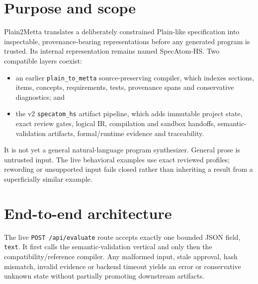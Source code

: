 \documentclass[11pt]{article}
\newcommand{\code}[1]{\texttt{#1}}
\begin{document}
\section{Purpose and scope}

Plain2Metta translates a deliberately constrained Plain-like specification
into inspectable, provenance-bearing representations before any generated
program is trusted.  Its internal representation remains named
SpecAtom-HS.  Two compatible layers coexist:

\begin{itemize}
\item an earlier \code{plain\_to\_metta} source-preserving compiler, which
indexes sections, items, concepts, requirements, tests, provenance spans and
conservative diagnostics; and
\item the v2 \code{specatom\_hs} artifact pipeline, which adds immutable
project state, exact review gates, logical IR, compilation and sandbox
handoffs, semantic-validation artifacts, formal/runtime evidence and
traceability.
\end{itemize}

It is not yet a general natural-language program synthesizer.  General prose
is untrusted input.  The live behavioral examples use exact reviewed profiles;
rewording or unsupported input fails closed rather than inheriting a result
from a superficially similar example.

\section{End-to-end architecture}

The live \code{POST /api/evaluate} route accepts exactly one bounded JSON field,
\code{text}.  It first calls the semantic-validation vertical and only then
the compatibility/reference compiler.  Any malformed input, stale approval,
hash mismatch, invalid evidence or backend timeout yields an error or
conservative unknown state without partially promoting downstream artifacts.
\end{document}
